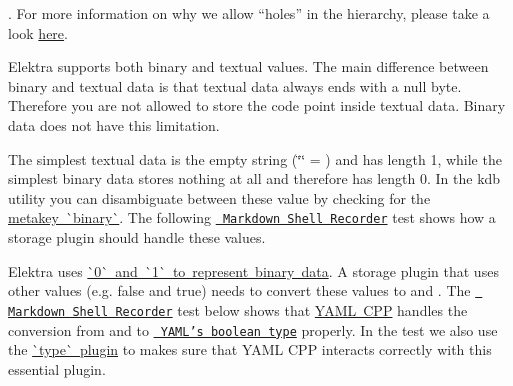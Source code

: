. For more information on why we allow “holes” in the hierarchy, please take a look \mbox{\hyperlink{doc_decisions_holes_md}{here}}.

Elektra supports both binary and textual values. The main difference between binary and textual data is that textual data always ends with a null byte. Therefore you are not allowed to store the code point {} inside textual data. Binary data does not have this limitation.

The simplest textual data is the empty string ({\ttfamily \char`\"{}\char`\"{}} = {}) and has length 1, while the simplest binary data stores nothing at all and therefore has length 0. In the {\ttfamily kdb} utility you can disambiguate between these value by checking for the \mbox{\hyperlink{doc_help_elektra-metadata_md}{metakey \`{}binary\`{}}}. The following \href{https://master.libelektra.org/tests/shell/shell_recorder/tutorial_wrapper}{\texttt{ Markdown Shell Recorder}} test shows how a storage plugin should handle these values.


\begin{DoxyCode}{0}
\DoxyCodeLine{}
\DoxyCodeLine{\#>}
\DoxyCodeLine{}
\DoxyCodeLine{\#>}
\DoxyCodeLine{\#>}
\DoxyCodeLine{}
\end{DoxyCode}


Elektra uses \mbox{\hyperlink{doc_decisions_boolean_md}{\`{}0\`{} and \`{}1\`{} to represent binary data}}. A storage plugin that uses other values (e.\+g. {\ttfamily false} and {\ttfamily true}) needs to convert these values to {} and {}. The \href{https://master.libelektra.org/tests/shell/shell_recorder/tutorial_wrapper}{\texttt{ Markdown Shell Recorder}} test below shows that \mbox{\hyperlink{autotoc_md780_src_plugins_yamlcpp_README_md}{Y\+A\+ML C\+PP}} handles the conversion from and to \href{https://yaml.org/spec/1.2/spec.html\#id2803629}{\texttt{ Y\+A\+M\+L’s boolean type}} properly. In the test we also use the \mbox{\hyperlink{autotoc_md695_src_plugins_type_README_md}{\`{}type\`{} plugin}} to makes sure that Y\+A\+ML C\+PP interacts correctly with this essential plugin.


